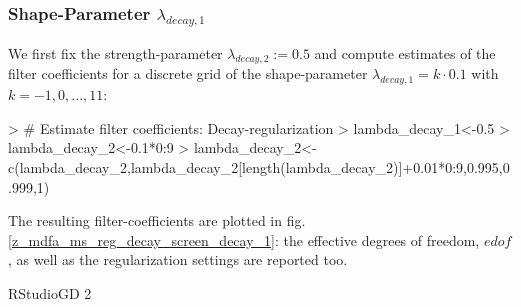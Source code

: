 \documentclass[a4paper]{book}
\begin{document}
\subsubsection{Shape-Parameter $\lambda_{decay,1}$}

 We first fix the strength-parameter $\lambda_{decay,2}:=0.5$ and compute estimates of the filter coefficients for a discrete grid of the shape-parameter $\lambda_{decay,1}=k\cdot 0.1$ with $k=-1,0,...,11$:  
\begin{Schunk}
\begin{Sinput}
> # Estimate filter coefficients: Decay-regularization
> lambda_decay_1<-0.5
> lambda_decay_2<-0.1*0:9
> lambda_decay_2<-c(lambda_decay_2,lambda_decay_2[length(lambda_decay_2)]+0.01*0:9,0.995,0.999,1)
\end{Sinput}
\end{Schunk}
The resulting filter-coefficients  are plotted in fig.\ref{z_mdfa_ms_reg_decay_screen_decay_1}: the effective degrees of freedom, $edof$, as well as the regularization settings are reported too.
\begin{Schunk}
\begin{Soutput}
RStudioGD 
        2 
\end{Soutput}
\end{Schunk}
\end{document}

